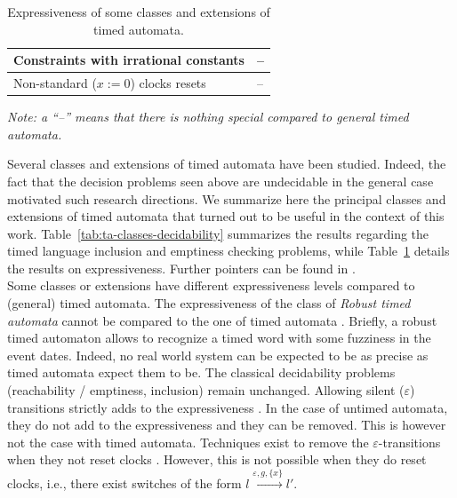 \begin{table}[htbp]
\begin{tabular}{|p{5cm}|p{7.5cm}|}
    \hline
    
    Constraints with irrational constants &
    -- \\

    \hline

    Non-standard ($x := 0$) clocks resets &
    -- \\

    \hline

\end{tabular}
\begin{flushleft}
	\emph{Note: a ``--'' means that there is nothing special compared to general timed automata.}
\end{flushleft}
\caption{Expressiveness of some classes and extensions of timed automata.}
\label{tab:ta-classes-expressiveness}
\end{table}

Several classes and extensions of timed automata have been studied. Indeed, the fact that the decision problems seen above are undecidable in the general case motivated such research directions. We summarize here the principal classes and extensions of timed automata that turned out to be useful in the context of this work.
%
Table~\ref{tab:ta-classes-decidability} summarizes the results regarding the timed language inclusion and emptiness checking problems, while Table~\ref{tab:ta-classes-expressiveness} details the results on expressiveness.
%
Further pointers can be found in \cite{RAPM04,RA98,ST03,JOJW04,BL-VAT06}.\\

Some classes or extensions have different expressiveness levels compared to (general) timed automata. The expressiveness of the class of \emph{Robust timed automata} cannot be compared to the one of timed automata \cite{RAPM04}. Briefly, a robust timed automaton allows to recognize a timed word with some fuzziness in the event dates. Indeed, no real world system can be expected to be as precise as timed automata expect them to be. The classical decidability problems (reachability / emptiness, inclusion) remain unchanged.
%
Allowing silent ($\varepsilon$) transitions strictly adds to the expressiveness \cite{VDPG97,BBVD+99,LSV:07:12}. In the case of untimed automata, they do not add to the expressiveness and they can be removed. This is however not the case with timed automata. Techniques exist to remove the $\varepsilon$-transitions when they not reset clocks \cite{VDPG97}. However, this is not possible when they do reset clocks, i.e., there exist switches of the form $l \xrightarrow{\varepsilon, g, \{ x \}} l'$.\\


